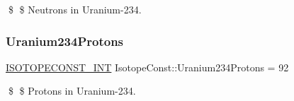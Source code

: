 \$ \$ Neutrons in Uranium-\/234. \mbox{\label{group___isotope_const-_uranium-_u234_gae6423ec7f68b44fc9706e3285d26dbec}} 
\subsubsection{\texorpdfstring{Uranium234\+Protons}{Uranium234Protons}}
{\footnotesize\ttfamily \mbox{\hyperlink{group___isotope_const-_macros_ga5f18360b3e99483a35c32d789e62621c}{I\+S\+O\+T\+O\+P\+E\+C\+O\+N\+S\+T\+\_\+\+I\+NT}} Isotope\+Const\+::\+Uranium234\+Protons = 92}

\$ \$ Protons in Uranium-\/234. 